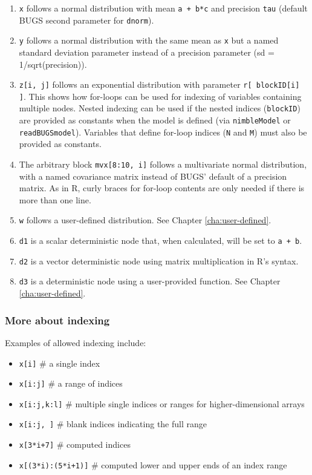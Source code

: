 \documentclass[12pt,oneside]{book}\usepackage[]{graphicx}\usepackage[]{color}
\def\cd#1{\texttt{#1}}
\begin{document}
\begin{enumerate}
\item \cd{x} follows a normal distribution with mean \cd{a + b*c} and precision \cd{tau} (default BUGS second parameter for \cd{dnorm}).
\item \cd{y} follows a normal distribution with the same mean as \cd{x} but a named standard deviation parameter instead of a precision parameter (sd = 1/sqrt(precision)).
\item \cd{z[i, j]} follows an exponential distribution with parameter
  \cd{r[ blockID[i] ]}.  This shows how for-loops can be used for indexing of variables containing
  multiple nodes.  Nested indexing can be used if the nested indices
  (\cd{blockID}) are provided as constants when the model is defined (via \cd{nimbleModel} or \cd{readBUGSmodel}).  Variables that define for-loop indices (\cd{N} and \cd{M}) must also be provided as constants.  
\item The arbitrary block \cd{mvx[8:10, i]} follows a multivariate
  normal distribution, with a named covariance matrix instead of BUGS'
  default of a precision matrix.  As in R, curly braces for for-loop
  contents are only needed if there is more than one line.
\item \cd{w} follows a user-defined distribution. See Chapter \ref{cha:user-defined}.
\item \cd{d1} is a scalar deterministic node that, when calculated, will be
  set to \cd{a + b}.
\item \cd{d2} is a vector deterministic node using matrix
  multiplication in R's syntax.
\item \cd{d3} is a deterministic node using a user-provided
  function.  See Chapter \ref{cha:user-defined}.
\end{enumerate}

\subsubsection{More about indexing}
\label{sec:indexing} 

Examples of allowed indexing include:
\begin{itemize}
\item \verb|x[i]|             \# a single index
\item \verb|x[i:j]|         \# a range of indices
\item \verb|x[i:j,k:l]| \# multiple single indices or ranges for higher-dimensional arrays
\item \verb|x[i:j, ]|     \# blank indices indicating the full range
\item \verb|x[3*i+7]|     \# computed indices
\item \verb|x[(3*i):(5*i+1)]|  \# computed lower and upper ends of an index range
\end{itemize}
 
\end{document}

